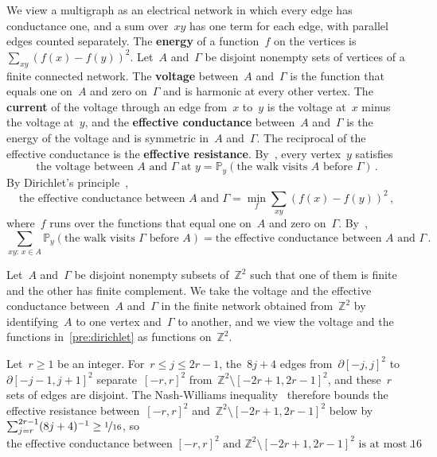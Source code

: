 \documentclass[11pt]{amsart}
\numberwithin{equation}{section}
\newcommand{\Z}{\mathbb Z}
\newcommand{\PP}{\mathbb P}
\newcommand{\nf}{\nicefrac}
\begin{document}
We view a multigraph as an electrical network in which every edge has conductance one, and a sum over~$xy$ has one term for each edge, with parallel edges counted separately. The \textbf{energy} of a function~$f$ on the vertices is~$\sum_{xy}(f(x)-f(y))^2$. Let~$A$ and~$\Gamma$ be disjoint nonempty sets of vertices of a finite connected network. The \textbf{voltage} between~$A$ and~$\Gamma$ is the function that equals one on~$A$ and zero on~$\Gamma$ and is harmonic at every other vertex. The \textbf{current} of the voltage through an edge from~$x$ to~$y$ is the voltage at~$x$ minus the voltage at~$y$, and the \textbf{effective conductance} between~$A$ and~$\Gamma$ is the energy of the voltage and is symmetric in~$A$ and~$\Gamma$. The reciprocal of the effective conductance is the \textbf{effective resistance}. By~\citet[equation~(2.2) and the uniqueness principle in Section~2.1]{LyonsPeres2016}, every vertex~$y$ satisfies
\begin{equation}\label{pre:voltage}
\text{the voltage between~$A$ and~$\Gamma$ at~$y$}=\PP_y(\text{the walk visits~$A$ before~$\Gamma$})\,.
\end{equation}
By Dirichlet's principle~\citep[Exercises~2.13 and~2.79]{LyonsPeres2016},
\begin{equation}\label{pre:dirichlet}
\text{the effective conductance between~$A$ and~$\Gamma$}=\min_f\sum_{xy}(f(x)-f(y))^2\,,
\end{equation}
where~$f$ runs over the functions that equal one on~$A$ and zero on~$\Gamma$. By~\citet[Exercise~2.47 and equation~(2.7)]{LyonsPeres2016},
\begin{equation}\label{pre:count-conductance}
\sum_{xy:\,x\in A}\PP_y(\text{the walk visits~$\Gamma$ before~$A$})=\text{the effective conductance between~$A$ and~$\Gamma$}\,.
\end{equation}

Let~$A$ and~$\Gamma$ be disjoint nonempty subsets of~$\Z^2$ such that one of them is finite and the other has finite complement. We take the voltage and the effective conductance between~$A$ and~$\Gamma$ in the finite network obtained from~$\Z^2$ by identifying~$A$ to one vertex and~$\Gamma$ to another, and we view the voltage and the functions in~\eqref{pre:dirichlet} as functions on~$\Z^2$.

Let~$r\geq1$ be an integer. For~$r\leq j\leq2r-1$, the~$8j+4$ edges from~$\partial[-j,j]^2$ to~$\partial[-j-1,j+1]^2$ separate~$[-r,r]^2$ from~$\Z^2\setminus [-2r+1,2r-1]^2$, and these~$r$ sets of edges are disjoint. The Nash-Williams inequality~\citep[Section~2.5]{LyonsPeres2016} therefore bounds the effective resistance between~$[-r,r]^2$ and~$\Z^2\setminus [-2r+1,2r-1]^2$ below by~$\sum_{j=r}^{2r-1}(8j+4)^{-1}\geq\nf1{16}$, so
\begin{equation}\label{pre:annulus}
\text{the effective conductance between~$[-r,r]^2$ and~$\Z^2\setminus [-2r+1,2r-1]^2$ is at most~$16$}\,.
\end{equation}
\end{document}
